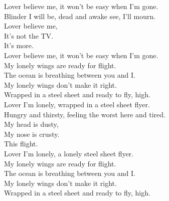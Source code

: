 Lover believe me, it won't be easy when I'm gone. \\
Blinder I will be, dead and awake see, I'll mourn. \\
Lover believe me, \\
It's not the TV. \\
It's more. \\
Lover believe me, it won't be easy when I'm gone. \\

My lonely wings are ready for flight. \\
The ocean is breathing between you and I. \\
My lonely wings don't make it right. \\
Wrapped in a steel sheet and ready to fly, high. \\

Lover I'm lonely, wrapped in a steel sheet flyer. \\
Hungry and thirsty, feeling the worst here and tired. \\
My head is dusty, \\
My nose is crusty. \\
This flight. \\
Lover I'm lonely, a lonely steel sheet flyer. \\

My lonely wings are ready for flight. \\
The ocean is breathing between you and I. \\
My lonely wings don't make it right. \\
Wrapped in a steel sheet and ready to fly, high. \\
